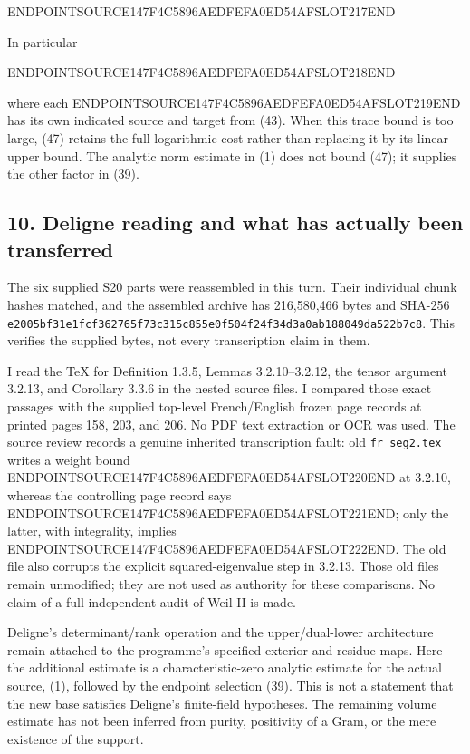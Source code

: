 ENDPOINTSOURCE147F4C5896AEDFEFA0ED54AFSLOT217END

In particular

ENDPOINTSOURCE147F4C5896AEDFEFA0ED54AFSLOT218END

where each ENDPOINTSOURCE147F4C5896AEDFEFA0ED54AFSLOT219END has its own indicated source and target from (43). When this trace bound is too large, (47) retains the full logarithmic cost rather than replacing it by its linear upper bound. The analytic norm estimate in (1) does not bound (47); it supplies the other factor in (39).

\subsection{10. Deligne reading and what has actually been transferred}\label{endpoint-arithmetic_original--deligne-reading-and-what-has-actually-been-transferred}

The six supplied S20 parts were reassembled in this turn. Their individual chunk hashes matched, and the assembled archive has 216,580,466 bytes and SHA-256 \texttt{e2005bf31e1fcf362765f73c315c855e0f504f24f34d3a0ab188049da522b7c8}. This verifies the supplied bytes, not every transcription claim in them.

I read the TeX for Definition 1.3.5, Lemmas 3.2.10--3.2.12, the tensor argument 3.2.13, and Corollary 3.3.6 in the nested source files. I compared those exact passages with the supplied top-level French/English frozen page records at printed pages 158, 203, and 206. No PDF text extraction or OCR was used. The source review records a genuine inherited transcription fault: old \texttt{fr\_seg2.tex} writes a weight bound ENDPOINTSOURCE147F4C5896AEDFEFA0ED54AFSLOT220END at 3.2.10, whereas the controlling page record says ENDPOINTSOURCE147F4C5896AEDFEFA0ED54AFSLOT221END; only the latter, with integrality, implies ENDPOINTSOURCE147F4C5896AEDFEFA0ED54AFSLOT222END. The old file also corrupts the explicit squared-eigenvalue step in 3.2.13. Those old files remain unmodified; they are not used as authority for these comparisons. No claim of a full independent audit of Weil II is made.

Deligne's determinant/rank operation and the upper/dual-lower architecture remain attached to the programme's specified exterior and residue maps. Here the additional estimate is a characteristic-zero analytic estimate for the actual source, (1), followed by the endpoint selection (39). This is not a statement that the new base satisfies Deligne's finite-field hypotheses. The remaining volume estimate has not been inferred from purity, positivity of a Gram, or the mere existence of the support.

